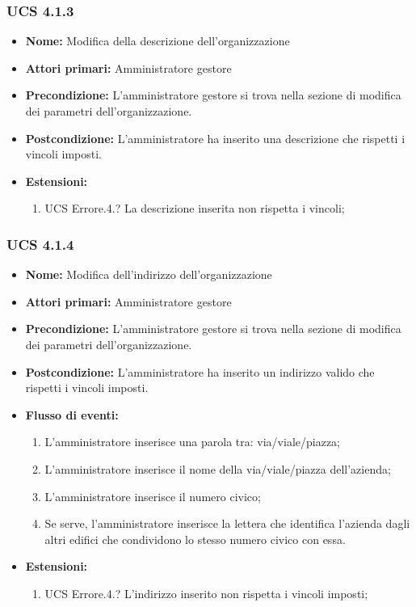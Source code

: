 \subsubsection{UCS 4.1.3}%
\begin{itemize}
\item \textbf{Nome:} Modifica della descrizione dell'organizzazione
\item \textbf{Attori primari:} Amministratore gestore
\item \textbf{Precondizione:} L'amministratore gestore si trova nella sezione di modifica dei parametri dell'organizzazione.
\item \textbf{Postcondizione:} L'amministratore ha inserito una descrizione che rispetti i vincoli imposti.
\item \textbf{Estensioni:}
\begin{enumerate}
    \item UCS Errore.4.? La descrizione inserita non rispetta i vincoli;
\end{enumerate}
\end{itemize}

\subsubsection{UCS 4.1.4}%
\begin{itemize}
\item \textbf{Nome:} Modifica dell'indirizzo dell'organizzazione
\item \textbf{Attori primari:} Amministratore gestore
\item \textbf{Precondizione:} L'amministratore gestore si trova nella sezione di modifica dei parametri dell'organizzazione.
\item \textbf{Postcondizione:} L'amministratore ha inserito un indirizzo valido che rispetti i vincoli imposti.
\item \textbf{Flusso di eventi:}
\begin{enumerate}
    \item L'amministratore inserisce una parola tra: via/viale/piazza;
    \item L'amministratore inserisce il nome della via/viale/piazza dell'azienda;
    \item L'amministratore inserisce il numero civico;
    \item Se serve, l'amministratore inserisce la lettera che identifica l'azienda dagli altri edifici che condividono lo stesso numero civico con essa.
\end{enumerate}
\item \textbf{Estensioni:}
\begin{enumerate}
    \item UCS Errore.4.? L'indirizzo inserito non rispetta i vincoli imposti;
\end{enumerate}
\end{itemize}